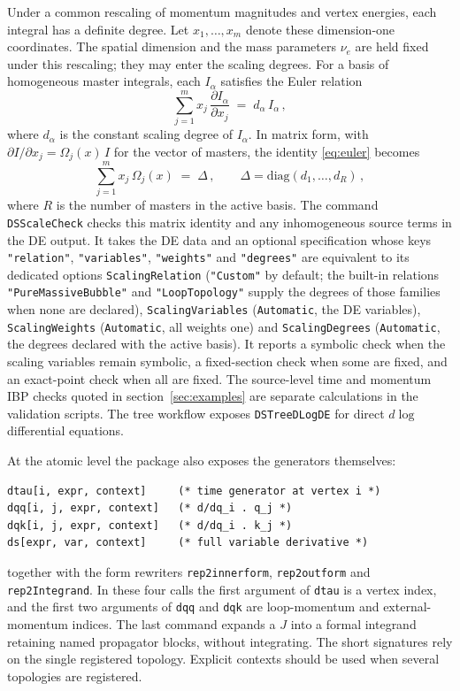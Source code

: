\documentclass[11pt,a4paper]{article}
\begin{document}
Under a common rescaling of momentum magnitudes and vertex energies, each integral has a definite
degree. Let $x_1,\dots,x_m$ denote these dimension-one coordinates. The spatial dimension and the
mass parameters $\nu_e$ are held fixed under this rescaling; they may enter the scaling degrees.
For a basis of homogeneous master integrals, each $I_\alpha$ satisfies the Euler
relation
\begin{equation}
\sum_{j=1}^{m} x_j\,\frac{\partial I_\alpha}{\partial x_j} \;=\; d_\alpha\, I_\alpha\,,
\label{eq:euler}
\end{equation}
where $d_\alpha$ is the constant scaling degree of $I_\alpha$. In matrix form, with
$\partial I/\partial x_j=\Omega_j(x)\,I$ for the vector of masters, the identity \eqref{eq:euler}
becomes
\begin{equation}
\sum_{j=1}^{m} x_j\, \Omega_j(x) \;=\; \Delta\,,\qquad
\Delta=\mathrm{diag}(d_1,\dots,d_R)\,,
\label{eq:eulerMatrix}
\end{equation}
where $R$ is the number of masters in the active basis.
The command \texttt{DSScaleCheck} checks this matrix identity and any inhomogeneous source
terms in the DE output. It takes the DE data and an optional specification whose keys
\texttt{"relation"}, \texttt{"variables"}, \texttt{"weights"} and \texttt{"degrees"} are equivalent
to its dedicated options \texttt{ScalingRelation} (\texttt{"Custom"} by default; the built-in
relations \texttt{"PureMassiveBubble"} and \texttt{"LoopTopology"} supply the degrees of those
families when none are declared), \texttt{ScalingVariables} (\texttt{Automatic}, the DE variables),
\texttt{ScalingWeights} (\texttt{Automatic}, all weights one) and \texttt{ScalingDegrees}
(\texttt{Automatic}, the degrees declared with the active basis).
It reports a symbolic check when the scaling variables remain symbolic,
a fixed-section check when some are fixed, and an exact-point check when all are fixed.
The source-level time and momentum IBP checks quoted in section~\ref{sec:examples} are separate
calculations in the validation scripts. The tree workflow exposes \texttt{DSTreeDLogDE} for
direct $d\log$ differential equations.

At the atomic level the package also exposes the generators themselves:
\begin{verbatim}
dtau[i, expr, context]     (* time generator at vertex i *)
dqq[i, j, expr, context]   (* d/dq_i . q_j *)
dqk[i, j, expr, context]   (* d/dq_i . k_j *)
ds[expr, var, context]     (* full variable derivative *)
\end{verbatim}
together with the form rewriters \texttt{rep2innerform}, \texttt{rep2outform} and
\texttt{rep2Integrand}. In these four calls the first argument of \texttt{dtau} is a vertex index,
and the first two arguments of \texttt{dqq} and \texttt{dqk} are loop-momentum and external-momentum
indices. The last command expands a $J$ into a formal integrand retaining named propagator blocks,
without integrating. The short signatures rely on the single registered topology. Explicit contexts should
be used when several topologies are registered.
\end{document}

